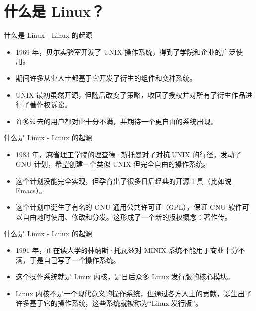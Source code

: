 \documentclass[UTF8]{ctexbeamer}
\begin{document}
\section{什么是 Linux？}
\begin{frame}{什么是 Linux - Linux 的起源}
    \begin{itemize}
        \item 1969 年，贝尔实验室开发了 UNIX 操作系统，得到了学院和企业的广泛使用。
        \item 期间许多从业人士都基于它开发了衍生的组件和变种系统。
        \item UNIX 最初虽然开源，但随后改变了策略，收回了授权并对所有了衍生作品进行了著作权诉讼。
        \item 许多过去的用户都对此十分不满，并期待一个更自由的系统出现。
    \end{itemize}
\end{frame}
\begin{frame}{什么是 Linux - Linux 的起源}
    \begin{itemize}
        \item 1983 年，麻省理工学院的理查德·斯托曼对了对抗 UNIX 的行径，发动了 GNU 计划，希望创建一个类似 UNIX 但完全自由的操作系统。
        \item 这个计划没能完全实现，但孕育出了很多日后经典的开源工具（比如说 Emacs）。
        \item 这个计划中诞生了有名的 GNU 通用公共许可证（GPL），保证 GNU 软件可以自由地时使用、修改和分发。这形成了一个新的版权概念：著作传。
    \end{itemize}
\end{frame}
\begin{frame}{什么是 Linux - Linux 的起源}
    \begin{itemize}

        \item 1991 年，正在读大学的林纳斯·托瓦兹对 MINIX 系统不能用于商业十分不满，于是自己写了一个操作系统。
        \item 这个操作系统就是 Linux 内核，是日后众多 Linux 发行版的核心模块。
        \item Linux 内核不是一个现代意义的操作系统，但通过各方人士的贡献，诞生出了许多基于它的操作系统，这些系统就被称为“Linux 发行版”。
    \end{itemize}
\end{frame}
\end{document}
